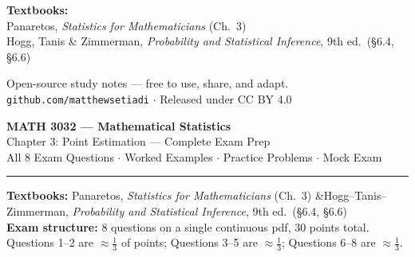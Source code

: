 \documentclass[11pt,a4paper]{article}
\begin{document}
\begin{titlepage}
\begin{center}
    \vspace{2cm}

    \begin{tcolorbox}[infobox, width=0.72\textwidth]
      \small\textbf{Textbooks:} \\
      Panaretos, \textit{Statistics for Mathematicians} (Ch.\ 3)\\
      Hogg, Tanis \& Zimmerman, \textit{Probability and Statistical Inference}, 9th ed.\ (\S6.4, \S6.6)
    \end{tcolorbox}

    \vfill

    \begin{tcolorbox}[successbox, width=0.72\textwidth]
      \small\centering
      Open-source study notes --- free to use, share, and adapt.\\
      \texttt{github.com/matthewsetiadi} \quad $\cdot$ \quad Released under CC BY 4.0
    \end{tcolorbox}

  \end{center}
\end{titlepage}

\begin{center}
  {\LARGE\bfseries MATH 3032 --- Mathematical Statistics}\\[6pt]
  {\large Chapter 3: Point Estimation --- Complete Exam Prep}\\[4pt]
  {\normalsize\color{sectionGray} All 8 Exam Questions $\cdot$ Worked Examples $\cdot$ Practice Problems $\cdot$ Mock Exam}\\[6pt]
  \rule{\linewidth}{0.8pt}
\end{center}

\vspace{4pt}

\begin{tcolorbox}[formulabox, title={}]
\textbf{Textbooks:} Panaretos, \textit{Statistics for Mathematicians} (Ch.\ 3) \quad\&\quad Hogg--Tanis--Zimmerman, \textit{Probability and Statistical Inference}, 9th ed.\ (§6.4, §6.6)\\[4pt]
\textbf{Exam structure:} 8 questions on a single continuous pdf, 30 points total. Questions 1--2 are $\approx\!\tfrac{1}{3}$ of points; Questions 3--5 are $\approx\!\tfrac{1}{3}$; Questions 6--8 are $\approx\!\tfrac{1}{3}$.
\end{tcolorbox}

\tableofcontents
\newpage

\end{document}
